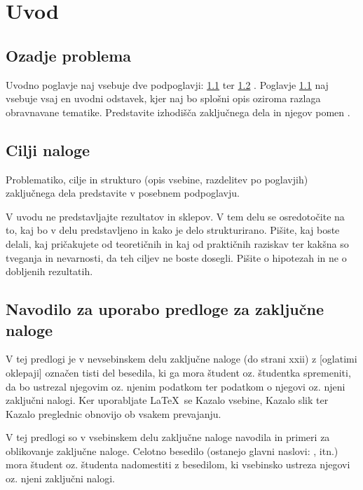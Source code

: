 %
\chapter{Uvod}\label{cha:uvod}

\section{Ozadje problema}\label{sec:ozadje_problema}
Uvodno poglavje naj vsebuje dve podpoglavji: \ref{sec:ozadje_problema}  ter \ref{sec:cilji_naloge} . Poglavje \ref{sec:ozadje_problema}  naj vsebuje vsaj en uvodni odstavek, kjer naj bo splošni opis oziroma razlaga obravnavane tematike. Predstavite izhodišča zaključnega dela in njegov pomen \cite{Bazant_2005,Bazant_2007,bazant_1991}.


\section{Cilji naloge}\label{sec:cilji_naloge}
Problematiko, cilje in strukturo (opis vsebine, razdelitev po poglavjih) zaključnega dela predstavite v posebnem podpoglavju.

V uvodu ne predstavljajte rezultatov in sklepov. V tem delu se osredotočite na to, kaj bo v delu predstavljeno in kako je delo strukturirano. Pišite, kaj boste delali, kaj pričakujete od teoretičnih in kaj od praktičnih raziskav ter kakšna so tveganja in nevarnosti, da teh ciljev ne boste dosegli. Pišite o hipotezah in ne o dobljenih rezultatih.

\section{Navodilo za uporabo predloge za zaključne naloge}\label{sec:uporaba_predloge}
V tej predlogi je v nevsebinskem delu zaključne naloge (do strani xxii) z [oglatimi oklepaji] označen tisti del besedila, ki ga mora študent oz. študentka spremeniti, da bo ustrezal njegovim oz. njenim podatkom ter podatkom o njegovi oz. njeni zaključni nalogi. Ker uporabljate \LaTeX~se Kazalo vsebine, Kazalo slik ter Kazalo preglednic obnovijo ob vsakem prevajanju.

V tej predlogi so v vsebinskem delu zaključne naloge navodila in primeri za oblikovanje zaključne naloge. Celotno besedilo (ostanejo glavni naslovi: ,  itn.) mora študent oz. študenta nadomestiti z besedilom, ki vsebinsko ustreza njegovi oz. njeni zaključni nalogi.

